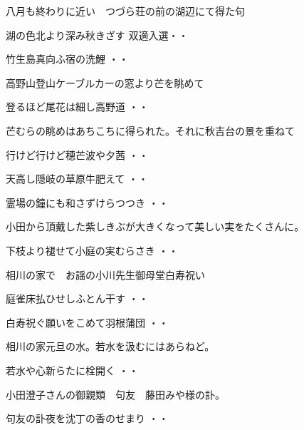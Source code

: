 八月も終わりに近い　つづら荘の前の湖辺にて得た句
\begin{shiika}湖の色北より深み秋きざす
\hfill{双適入選・・}\end{shiika}
\begin{shiika}竹生島真向ふ宿の洗鯉
\hfill{・・}\end{shiika}
\vspace{0.6cm}
高野山登山ケーブルカーの窓より芒を眺めて
\begin{shiika}登るほど尾花は細し高野道
\hfill{・・}\end{shiika}
\vspace{0.6cm}
芒むらの眺めはあちこちに得られた。それに秋吉台の景を重ねて
\begin{shiika}行けど行けど穂芒波や夕茜
\hfill{・・}\end{shiika}
\vspace{0.6cm}
\begin{shiika}天高し隠岐の草原牛肥えて
\hfill{・・}\end{shiika}
\begin{shiika}霊場の鐘にも和さずけらつつき
\hfill{・・}\end{shiika}
\vspace{0.6cm}
小田から頂戴した紫しきぶが大きくなって美しい実をたくさんに。
\begin{shiika}下枝より褪せて小庭の実むらさき
\hfill{・・}\end{shiika}
\vspace{0.6cm}
相川の家で　お謡の小川先生御母堂白寿祝い
\begin{shiika}庭雀床払ひせしふとん干す
\hfill{・・}\end{shiika}
\begin{shiika}白寿祝ぐ願いをこめて羽根蒲団
\hfill{・・}\end{shiika}
相川の家元旦の水。若水を汲むにはあらねど。
\begin{shiika}若水や心新らたに栓開く
\hfill{・・}\end{shiika}
\vspace{0.6cm}
小田澄子さんの御親類　句友　藤田みや様の訃。
\begin{shiika}句友の訃夜を沈丁の香のせまり
\hfill{・・}\end{shiika}
